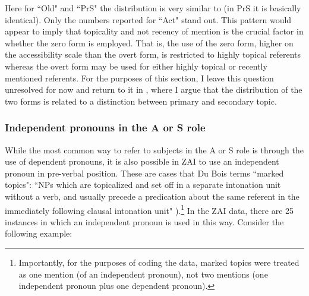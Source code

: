Here for ``Old" and ``PrS" the distribution is very similar to  (in PrS it is basically identical). Only the numbers reported for ``Act" stand out. This pattern would appear to imply that topicality and not recency of mention is the crucial factor in whether the zero form is employed. That is, the use of the zero form, higher on the accessibility scale than the overt form, is restricted to highly topical referents whereas the overt form may be used for either highly topical or recently mentioned referents. For the purposes of this section, I leave this question unresolved for now and return to it in , where I argue that the distribution of the two forms is related to a distinction between primary and secondary topic. 
 

\subsubsection{Independent pronouns in the A or S role}\label{markedtopics}

While the most common way to refer to subjects in the A or S role is through the use of dependent pronouns, it is also possible in ZAI to use an independent pronoun in pre-verbal position. These are cases that Du Bois terms ``marked topics": ``NPs which are topicalized and set off in a separate intonation unit without a verb, and usually precede a predication about the same referent in the immediately following clausal intonation unit" \citep[814, note 11]{dubois1987}).\footnote{Importantly, for the purposes of coding the data, marked topics were treated as one mention (of an independent pronoun), not two mentions (one independent pronoun plus one dependent pronoun).} In the ZAI data, there are 25 instances in which an independent pronoun is used in this way. Consider the following example: 

